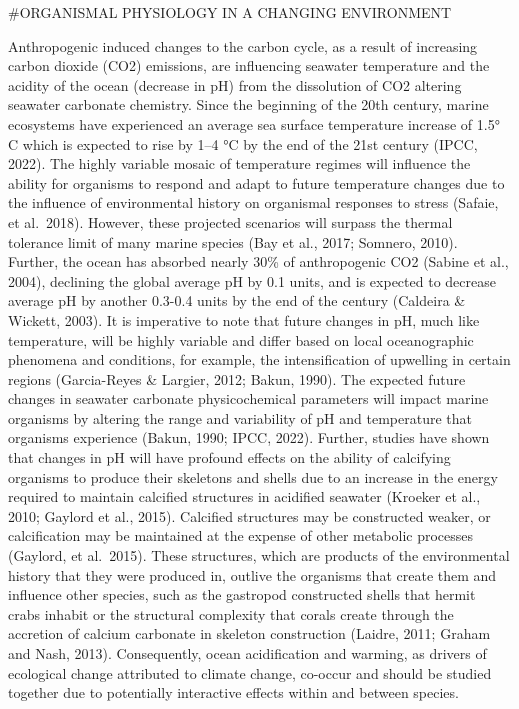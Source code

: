 \documentclass[
  11pt,
]{article}
\begin{document}
\begin{centering}
#ORGANISMAL PHYSIOLOGY IN A CHANGING ENVIRONMENT
\end{centering}

Anthropogenic induced changes to the carbon cycle, as a result of
increasing carbon dioxide (CO2) emissions, are influencing seawater
temperature and the acidity of the ocean (decrease in pH) from the
dissolution of CO2 altering seawater carbonate chemistry. Since the
beginning of the 20th century, marine ecosystems have experienced an
average sea surface temperature increase of 1.5° C which is expected to
rise by 1--4 °C by the end of the 21st century (IPCC, 2022). The highly
variable mosaic of temperature regimes will influence the ability for
organisms to respond and adapt to future temperature changes due to the
influence of environmental history on organismal responses to stress
(Safaie, et al.~2018). However, these projected scenarios will surpass
the thermal tolerance limit of many marine species (Bay et al., 2017;
Somnero, 2010). Further, the ocean has absorbed nearly 30\% of
anthropogenic CO2 (Sabine et al., 2004), declining the global average pH
by 0.1 units, and is expected to decrease average pH by another 0.3-0.4
units by the end of the century (Caldeira \& Wickett, 2003). It is
imperative to note that future changes in pH, much like temperature,
will be highly variable and differ based on local oceanographic
phenomena and conditions, for example, the intensification of upwelling
in certain regions (Garcia-Reyes \& Largier, 2012; Bakun, 1990). The
expected future changes in seawater carbonate physicochemical parameters
will impact marine organisms by altering the range and variability of pH
and temperature that organisms experience (Bakun, 1990; IPCC, 2022).
Further, studies have shown that changes in pH will have profound
effects on the ability of calcifying organisms to produce their
skeletons and shells due to an increase in the energy required to
maintain calcified structures in acidified seawater (Kroeker et al.,
2010; Gaylord et al., 2015). Calcified structures may be constructed
weaker, or calcification may be maintained at the expense of other
metabolic processes (Gaylord, et al.~2015). These structures, which are
products of the environmental history that they were produced in,
outlive the organisms that create them and influence other species, such
as the gastropod constructed shells that hermit crabs inhabit or the
structural complexity that corals create through the accretion of
calcium carbonate in skeleton construction (Laidre, 2011; Graham and
Nash, 2013). Consequently, ocean acidification and warming, as drivers
of ecological change attributed to climate change, co-occur and should
be studied together due to potentially interactive effects within and
between species.
\end{document}
